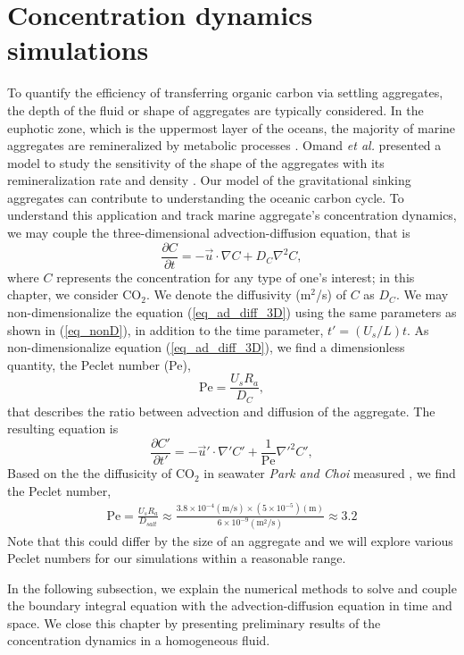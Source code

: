 \section{Concentration dynamics simulations}
\label{sec:concentration}
To quantify the efficiency of transferring organic carbon via settling aggregates, the depth of the fluid or shape of aggregates are typically considered.
In the euphotic zone, which is the uppermost layer of the oceans, the majority of marine aggregates are remineralized by metabolic processes \cite{henson_global_2012}. Omand {\it{et al.}} presented a model to study the sensitivity of the shape of the aggregates with its remineralization rate and density \cite{omand_sinking_2020}. 
Our model of the gravitational sinking aggregates can contribute to understanding the oceanic carbon cycle. 
To understand this application and track marine aggregate's concentration dynamics, we may couple the three-dimensional advection-diffusion equation, that is 
\begin{equation}
	\frac{\partial C }{\partial t} 
	= - \vec{u} \cdot \nabla C
	+ D_{C} \nabla^2 C,
	\label{eq_ad_diff_3D}
\end{equation} 
where $C$ represents the concentration for any type of one's interest; in this chapter, we consider CO$_2$. 
We denote the diffusivity (m$^2$/s) of $C$ as $D_{C}$.
We may non-dimensionalize the equation (\ref{eq_ad_diff_3D}) using the same parameters as shown in (\ref{eq_nonD}), in addition to the time parameter, $t' = \left(U_s/L \right) t$. 
As non-dimensionalize equation (\ref{eq_ad_diff_3D}), 
 we find a dimensionless quantity, the Peclet number (Pe), 
 \[
\text{Pe} = \frac{U_s R_a}{D_C},	
 \]
 that describes the ratio between advection and diffusion of the aggregate.  
 The resulting equation is
\begin{equation}
	\frac{\partial C' }{\partial t'} 
	= - \vec{u}' \cdot \nabla' C'
	+ \frac{1}{\text{Pe}} \nabla'^2 C',
	\label{eq_ad_diff_nonD}
\end{equation}
Based on the the diffusicity of CO$_2$ in seawater \textit{Park and Choi} measured \cite{park_performance_2020}, we find the Peclet number,
\begin{align}
	\text{Pe} 
	= \frac{U_s R_a }{D_{salt}} 
	\approx \frac{3.8 \times 10^{-4}(\text{m/s}) \times \left(5 \times 10^{-5} \right) (\text{m})}{6 \times 10^{-9} (\text{m}^2\text{/s})} \approx 3.2
\end{align}
Note that this could differ by the size of an aggregate and we will explore various Peclet numbers for our simulations within a reasonable range. 
\par 
In the following subsection, we explain the numerical methods to solve and couple the boundary integral equation with the advection-diffusion equation in time and space. We close this chapter by presenting preliminary results of the concentration dynamics in a homogeneous fluid. 
